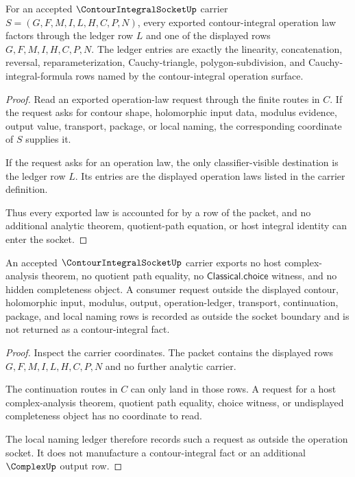 \begin{theorem}
\label{thm:contour-integral-socket-ledger-exactness}
For an accepted $\ContourIntegralSocketUp$ carrier $S=(G,F,M,I,L,H,C,P,N)$, every exported contour-integral operation law factors through the ledger row $L$ and one of the displayed rows $G,F,M,I,H,C,P,N$. The ledger entries are exactly the linearity, concatenation, reversal, reparameterization, Cauchy-triangle, polygon-subdivision, and Cauchy-integral-formula rows named by the contour-integral operation surface.
\end{theorem}
\begin{proof}
Read an exported operation-law request through the finite routes in $C$. If the request asks for contour shape, holomorphic input data, modulus evidence, output value, transport, package, or local naming, the corresponding coordinate of $S$ supplies it.

If the request asks for an operation law, the only classifier-visible destination is the ledger row $L$. Its entries are the displayed operation laws listed in the carrier definition.

Thus every exported law is accounted for by a row of the packet, and no additional analytic theorem, quotient-path equation, or host integral identity can enter the socket.
\end{proof}

\begin{theorem}
\label{thm:contour-integral-socket-non-escape}
An accepted $\ContourIntegralSocketUp$ carrier exports no host complex-analysis theorem, no quotient path equality, no $\mathsf{Classical.choice}$ witness, and no hidden completeness object. A consumer request outside the displayed contour, holomorphic input, modulus, output, operation-ledger, transport, continuation, package, and local naming rows is recorded as outside the socket boundary and is not returned as a contour-integral fact.
\end{theorem}
\begin{proof}
Inspect the carrier coordinates. The packet contains the displayed rows $G,F,M,I,L,H,C,P,N$ and no further analytic carrier.

The continuation routes in $C$ can only land in those rows. A request for a host complex-analysis theorem, quotient path equality, choice witness, or undisplayed completeness object has no coordinate to read.

The local naming ledger therefore records such a request as outside the operation socket. It does not manufacture a contour-integral fact or an additional $\ComplexUp$ output row.
\end{proof}

